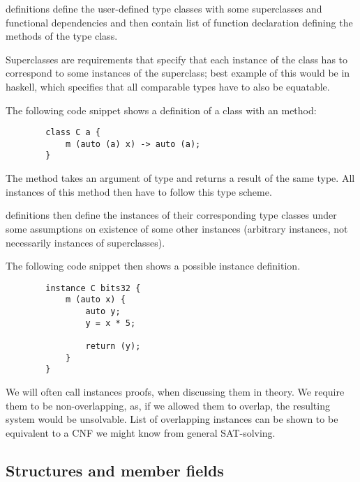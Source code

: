  definitions define the user-defined type classes with some superclasses and functional dependencies and then contain list of function declaration defining the methods of the type class.

Superclasses are requirements that specify that each instance of the class has to correspond to some instances of the superclass; best example of this would be  in haskell, which specifies that all comparable types have to also be equatable.

\begin{ex}[Classes]
    The following code snippet shows a definition of a  class with an  method:

    \begin{lstlisting}
        class C a {
            m (auto (a) x) -> auto (a);
        }
    \end{lstlisting}

    The  method takes an argument of type  and returns a result of the same type. All instances of this method then have to follow this type scheme.
\end{ex}

 definitions then define the instances of their corresponding type classes under some assumptions on existence of some other instances (arbitrary instances, not necessarily instances of superclasses).

\begin{ex}[Instance]
    The following code snippet then shows a possible instance definition.

    \begin{lstlisting}
        instance C bits32 {
            m (auto x) {
                auto y;
                y = x * 5;

                return (y);
            }
        }
    \end{lstlisting}
\end{ex}

We will often call instances proofs, when discussing them in theory. We require them to be non-overlapping, as, if we allowed them to overlap, the resulting system would be unsolvable. List of overlapping instances can be shown to be equivalent to a CNF we might know from general SAT-solving.

\subsection{Structures and member fields}

